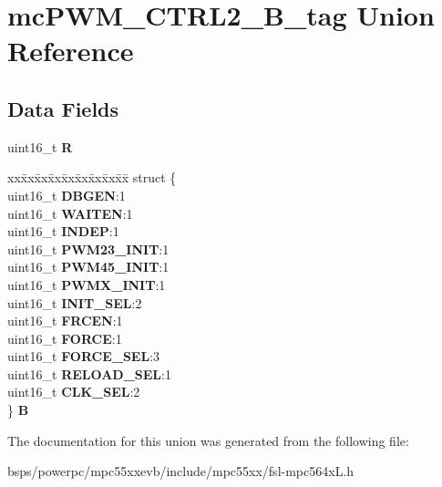 \hypertarget{unionmcPWM__CTRL2__16B__tag}{}\section{mc\+P\+W\+M\+\_\+\+C\+T\+R\+L2\+\_\+B\+\_\+tag Union Reference}
\label{unionmcPWM__CTRL2__16B__tag}
\subsection*{Data Fields}
\begin{DoxyCompactItemize}
\item 
\mbox{\label{unionmcPWM__CTRL2__16B__tag_a94bbf9b161f625c3901aa50ad3c9b583}} 
uint16\+\_\+t {\bfseries R}
\item 
\mbox{\label{unionmcPWM__CTRL2__16B__tag_aad2b1aae83ffee5307df7d5be591ee30}} 
\begin{tabbing}
xx\=xx\=xx\=xx\=xx\=xx\=xx\=xx\=xx\=\kill
struct \{\\
\>uint16\_t {\bfseries DBGEN}:1\\
\>uint16\_t {\bfseries WAITEN}:1\\
\>uint16\_t {\bfseries INDEP}:1\\
\>uint16\_t {\bfseries PWM23\_INIT}:1\\
\>uint16\_t {\bfseries PWM45\_INIT}:1\\
\>uint16\_t {\bfseries PWMX\_INIT}:1\\
\>uint16\_t {\bfseries INIT\_SEL}:2\\
\>uint16\_t {\bfseries FRCEN}:1\\
\>uint16\_t {\bfseries FORCE}:1\\
\>uint16\_t {\bfseries FORCE\_SEL}:3\\
\>uint16\_t {\bfseries RELOAD\_SEL}:1\\
\>uint16\_t {\bfseries CLK\_SEL}:2\\
\} {\bfseries B}\\

\end{tabbing}\end{DoxyCompactItemize}


The documentation for this union was generated from the following file\+:\begin{DoxyCompactItemize}
\item 
bsps/powerpc/mpc55xxevb/include/mpc55xx/fsl-\/mpc564x\+L.\+h\end{DoxyCompactItemize}
